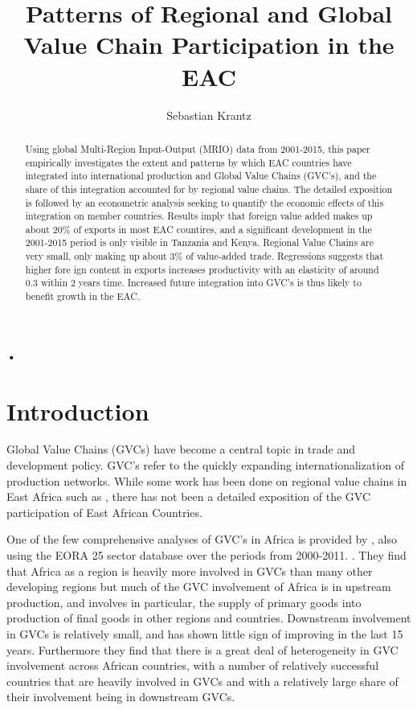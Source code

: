 \textbf{\textbf{•}}\documentclass[a4paper]{article}
\title{\textbf{Patterns of Regional and Global Value Chain Participation in the EAC}}
\author{Sebastian Krantz}
\begin{document}
\maketitle

\begin{abstract}
Using global Multi-Region Input-Output (MRIO) data from 2001-2015, this paper empirically investigates the extent and patterns by which EAC countries have integrated into international production and Global Value Chains (GVC's), and the share of this integration accounted for by regional value chains. The detailed exposition is followed by an econometric analysis seeking to quantify the economic effects of this integration on member countries. Results imply that foreign value added makes up about 20\% of exports in most EAC countires, and a significant development in the 2001-2015 period is only visible in Tanzania and Kenya. Regional Value Chains are very small, only making up about 3\% of value-added trade. Regressions suggests that higher fore ign content in exports increases productivity with an elasticity of around 0.3 within 2 years time. Increased future integration into GVC's is thus likely to benefit growth in the EAC.    
\end{abstract}
\tableofcontents

\newpage

\section{Introduction}

Global Value Chains (GVCs) have become a central topic in trade and development policy. GVC's refer to the quickly expanding internationalization of production networks. While some work has been done on regional value chains in East Africa such as \citet{daly2016maize}, there has not been a detailed exposition of the GVC participation of East African Countries. \newline

One of the few comprehensive analyses of GVC's in Africa is provided by \citet{foster2015global}, also using the EORA 25 sector database over the periods from 2000-2011. . 
They find that Africa as a region is heavily more involved in GVCs than many other developing regions but much of the GVC involvement of Africa is in upstream production, and involves in particular, the supply of primary goods into production of final goods in other regions and countries. Downstream involvement in GVCs is relatively small, and has shown little sign of improving in the last 15 years. Furthermore they find that there is a great deal of heterogeneity in GVC involvement across African countries, with a number of relatively successful countries that are heavily involved in GVCs and with a relatively large share of their involvement being in downstream GVCs. 
\end{document}
